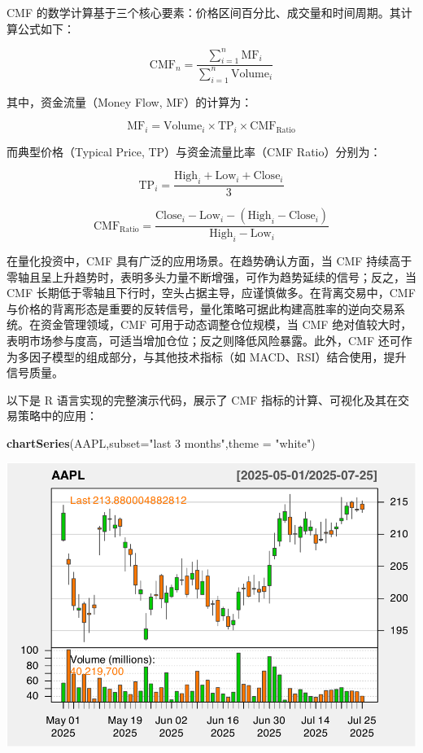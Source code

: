 \documentclass[]{ctexbook}
\newenvironment{Shaded}{\begin{snugshade}}{\end{snugshade}}
\newcommand{\AttributeTok}[1]{\textcolor[rgb]{0.13,0.29,0.53}{#1}}
\newcommand{\FunctionTok}[1]{\textcolor[rgb]{0.13,0.29,0.53}{\textbf{#1}}}
\newcommand{\NormalTok}[1]{#1}
\newcommand{\StringTok}[1]{\textcolor[rgb]{0.31,0.60,0.02}{#1}}
\begin{document}
CMF 的数学计算基于三个核心要素：价格区间百分比、成交量和时间周期。其计算公式如下：

\[
\text{CMF}_n = \frac{\sum_{i=1}^{n}\text{MF}_i}{\sum_{i=1}^{n}\text{Volume}_i}
\]

其中，资金流量（Money Flow, MF）的计算为：

\[\text{MF}_i = \text{Volume}_{i}\times \text{TP}_i \times \text{CMF}_\text{Ratio}\]

而典型价格（Typical Price, TP）与资金流量比率（CMF Ratio）分别为：

\[\text{TP}_i = \frac{\text{High}_i + \text{Low}_i + \text{Close}_i}{3}\]

\[\text{CMF}_\text{Ratio} = \frac{\text{Close}_i - \text{Low}_i - (\text{High}_i - \text{Close}_i)}{\text{High}_i - \text{Low}_i}
\]

在量化投资中，CMF 具有广泛的应用场景。在趋势确认方面，当 CMF 持续高于零轴且呈上升趋势时，表明多头力量不断增强，可作为趋势延续的信号；反之，当 CMF 长期低于零轴且下行时，空头占据主导，应谨慎做多。在背离交易中，CMF 与价格的背离形态是重要的反转信号，量化策略可据此构建高胜率的逆向交易系统。在资金管理领域，CMF 可用于动态调整仓位规模，当 CMF 绝对值较大时，表明市场参与度高，可适当增加仓位；反之则降低风险暴露。此外，CMF 还可作为多因子模型的组成部分，与其他技术指标（如 MACD、RSI）结合使用，提升信号质量。

以下是 R 语言实现的完整演示代码，展示了 CMF 指标的计算、可视化及其在交易策略中的应用：

\begin{Shaded}
\begin{Highlighting}[]
\FunctionTok{chartSeries}\NormalTok{(AAPL,}\AttributeTok{subset=}\StringTok{"last 3 months"}\NormalTok{,}\AttributeTok{theme =} \StringTok{"white"}\NormalTok{)}
\end{Highlighting}
\end{Shaded}

\includegraphics[width=0.9\linewidth]{QuantmodHandbook_files/figure-latex/cmf-1}
\end{document}

